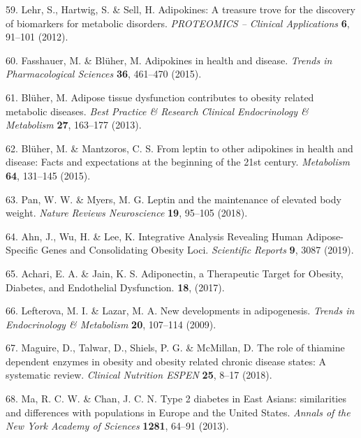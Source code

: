 \documentclass[11pt,twoside]{bristolthesis}
\begin{document}
\leavevmode\hypertarget{ref-Lehr2012}{}%
59. Lehr, S., Hartwig, S. \& Sell, H. Adipokines: A treasure trove for the discovery of biomarkers for metabolic disorders. \emph{PROTEOMICS -- Clinical Applications} \textbf{6}, 91--101 (2012).

\leavevmode\hypertarget{ref-Fasshauer2015}{}%
60. Fasshauer, M. \& Blüher, M. Adipokines in health and disease. \emph{Trends in Pharmacological Sciences} \textbf{36}, 461--470 (2015).

\leavevmode\hypertarget{ref-Bluher2013}{}%
61. Blüher, M. Adipose tissue dysfunction contributes to obesity related metabolic diseases. \emph{Best Practice \& Research Clinical Endocrinology \& Metabolism} \textbf{27}, 163--177 (2013).

\leavevmode\hypertarget{ref-Bluher2015}{}%
62. Blüher, M. \& Mantzoros, C. S. From leptin to other adipokines in health and disease: Facts and expectations at the beginning of the 21st century. \emph{Metabolism} \textbf{64}, 131--145 (2015).

\leavevmode\hypertarget{ref-Pan2018}{}%
63. Pan, W. W. \& Myers, M. G. Leptin and the maintenance of elevated body weight. \emph{Nature Reviews Neuroscience} \textbf{19}, 95--105 (2018).

\leavevmode\hypertarget{ref-Ahn2019}{}%
64. Ahn, J., Wu, H. \& Lee, K. Integrative Analysis Revealing Human Adipose-Specific Genes and Consolidating Obesity Loci. \emph{Scientific Reports} \textbf{9}, 3087 (2019).

\leavevmode\hypertarget{ref-Achari2017}{}%
65. Achari, E. A. \& Jain, K. S. Adiponectin, a Therapeutic Target for Obesity, Diabetes, and Endothelial Dysfunction. \textbf{18}, (2017).

\leavevmode\hypertarget{ref-Lefterova2009}{}%
66. Lefterova, M. I. \& Lazar, M. A. New developments in adipogenesis. \emph{Trends in Endocrinology \& Metabolism} \textbf{20}, 107--114 (2009).

\leavevmode\hypertarget{ref-Maguire2018}{}%
67. Maguire, D., Talwar, D., Shiels, P. G. \& McMillan, D. The role of thiamine dependent enzymes in obesity and obesity related chronic disease states: A systematic review. \emph{Clinical Nutrition ESPEN} \textbf{25}, 8--17 (2018).

\leavevmode\hypertarget{ref-Ma2013a}{}%
68. Ma, R. C. W. \& Chan, J. C. N. Type 2 diabetes in East Asians: similarities and differences with populations in Europe and the United States. \emph{Annals of the New York Academy of Sciences} \textbf{1281}, 64--91 (2013).
\end{document}
